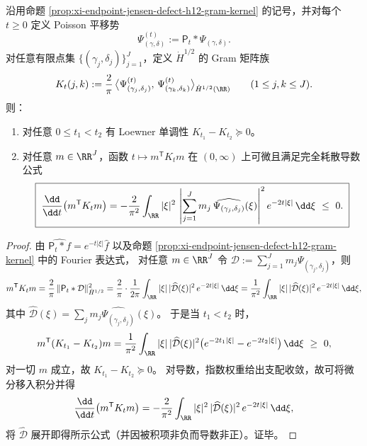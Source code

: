 \begin{theorem}\label{thm:xi-endpoint-psi-poisson-shift-loewner-monotone}
沿用命题 \ref{prop:xi-endpoint-jensen-defect-h12-gram-kernel} 的记号，并对每个 \(t\ge 0\) 定义 Poisson 平移势
\[
\Psi_{(\gamma,\delta)}^{(t)}:=\mathsf P_t*\Psi_{(\gamma,\delta)}.
\]
对任意有限点集 \(\{(\gamma_j,\delta_j)\}_{j=1}^{J}\)，定义 \(\dot H^{1/2}\) 的 Gram 矩阵族
\[
K_t(j,k):=\frac{2}{\pi}\,\bigl\langle \Psi_{(\gamma_j,\delta_j)}^{(t)},\,\Psi_{(\gamma_k,\delta_k)}^{(t)}\bigr\rangle_{\dot H^{1/2}(\RR)}
\qquad(1\le j,k\le J).
\]
则：
\begin{enumerate}
  \item 对任意 \(0\le t_1<t_2\) 有 Loewner 单调性 \(K_{t_1}-K_{t_2}\succeq 0\)。
  \item 对任意 \(m\in\RR^{J}\)，函数 \(t\mapsto m^{\mathsf T}K_t m\) 在 \((0,\infty)\) 上可微且满足完全耗散导数公式
  \[
  \boxed{\;
  \frac{\dd}{\dd t}\bigl(m^{\mathsf T}K_t m\bigr)
  =-\frac{2}{\pi^2}\int_{\RR}|\xi|^2\,
  \left|\sum_{j=1}^{J}m_j\,\widehat{\Psi_{(\gamma_j,\delta_j)}}(\xi)\right|^2
  e^{-2t|\xi|}\,\dd\xi\ \le\ 0. \;}
  \]
\end{enumerate}
\end{theorem}
\begin{proof}
由 \(\widehat{\mathsf P_t*f}=e^{-t|\xi|}\widehat f\) 以及命题 \ref{prop:xi-endpoint-jensen-defect-h12-gram-kernel} 中的 Fourier 表达式，
对任意 \(m\in\RR^J\) 令 \(\mathcal D:=\sum_{j=1}^{J}m_j\Psi_{(\gamma_j,\delta_j)}\)，则
\[
m^{\mathsf T}K_t m
=\frac{2}{\pi}\,\|\mathsf P_t*\mathcal D\|_{\dot H^{1/2}}^2
=\frac{2}{\pi}\cdot\frac{1}{2\pi}\int_{\RR}|\xi|\,|\widehat{\mathcal D}(\xi)|^2\,e^{-2t|\xi|}\,\dd\xi
=\frac{1}{\pi^2}\int_{\RR}|\xi|\,|\widehat{\mathcal D}(\xi)|^2\,e^{-2t|\xi|}\,\dd\xi,
\]
其中 \(\widehat{\mathcal D}(\xi)=\sum_j m_j\widehat{\Psi_{(\gamma_j,\delta_j)}}(\xi)\)。
于是当 \(t_1<t_2\) 时，
\[
m^{\mathsf T}(K_{t_1}-K_{t_2})m
=\frac{1}{\pi^2}\int_{\RR}|\xi|\,|\widehat{\mathcal D}(\xi)|^2\bigl(e^{-2t_1|\xi|}-e^{-2t_2|\xi|}\bigr)\,\dd\xi\ \ge\ 0,
\]
对一切 \(m\) 成立，故 \(K_{t_1}-K_{t_2}\succeq 0\)。
对导数，指数权重给出支配收敛，故可将微分移入积分并得
\[
\frac{\dd}{\dd t}\bigl(m^{\mathsf T}K_t m\bigr)
=-\frac{2}{\pi^2}\int_{\RR}|\xi|^2\,|\widehat{\mathcal D}(\xi)|^2\,e^{-2t|\xi|}\,\dd\xi,
\]
将 \(\widehat{\mathcal D}\) 展开即得所示公式（并因被积项非负而导数非正）。证毕。
\end{proof}

